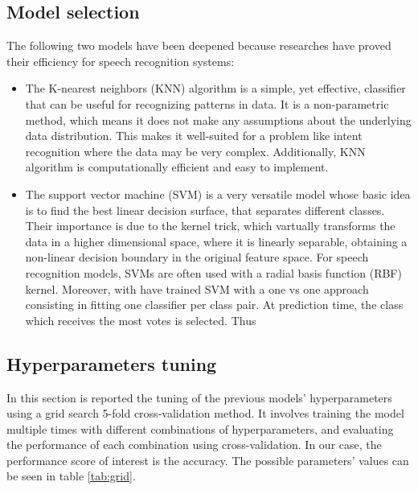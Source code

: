 \documentclass[conference]{IEEEtran}
\begin{document}
\subsection{Model selection}
The following two models have been deepened because researches have proved their efficiency for speech recognition systems:
\begin{itemize}
    \item The K-nearest neighbors (KNN) algorithm is a simple, yet effective, classifier that can be useful for recognizing patterns in data.
    It is a non-parametric method, which means it does not make any assumptions about the underlying data distribution.
    This makes it well-suited for a problem like intent recognition where the data may be very complex.
    Additionally, KNN algorithm is computationally efficient and easy to implement.

    \item The support vector machine (SVM) is a very versatile model whose basic idea is to find the best linear decision surface, that separates different classes.
    Their importance is due to the kernel trick, which vartually transforms the data in a higher dimensional space, where it is linearly separable, obtaining a non-linear decision boundary in the original feature space.
    For speech recognition models, SVMs are often used with a radial basis function (RBF) kernel.
    Moreover, with have trained SVM with a one vs one approach consisting in fitting one classifier per class pair.
    At prediction time, the class which receives the most votes is selected.
    Thus
\end{itemize}

\subsection{Hyperparameters tuning}
In this section is reported the tuning of the previous models' hyperparameters using a grid search 5-fold cross-validation method.
It involves training the model multiple times with different combinations of hyperparameters, and evaluating the performance of each combination using cross-validation.
In our case, the performance score of interest is the accuracy.
The possible parameters' values can be seen in table \ref{tab:grid}.
\end{document}
